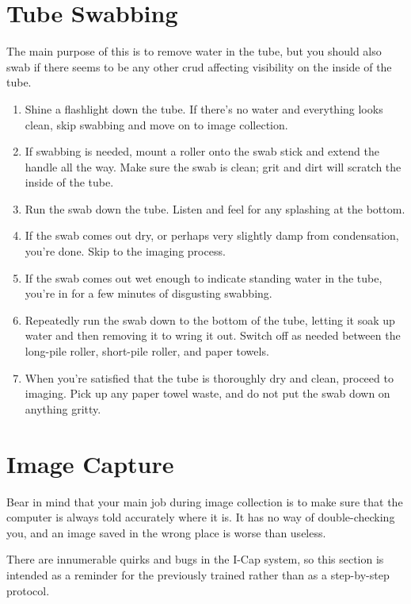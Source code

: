 \documentclass[11pt]{article}
\begin{document}
\section{Tube Swabbing}
	The main purpose of this is to remove water in the tube, but you should also  swab if there seems to be any other crud affecting visibility on the inside of the tube. 
	\begin{enumerate}
		\item{Shine a flashlight down the tube. If there's no water and everything looks clean, skip swabbing and move on to image collection.}
		\item{If swabbing is needed, mount a roller onto the swab stick and extend the handle all the way. Make sure the swab is clean; grit and dirt will scratch the inside of the tube.}
		\item{Run the swab down the tube. Listen and feel for any splashing at the bottom.}
		\item{If the swab comes out dry, or perhaps very slightly damp from condensation, you're done. Skip to the imaging process.}
		\item{If the swab comes out wet enough to indicate standing water in the  tube, you're in for a few minutes of disgusting swabbing.}
		\item{Repeatedly run the swab down to the bottom of the tube, letting it soak up water and then removing it to wring it out. Switch off as needed between the long-pile roller, short-pile roller, and paper towels.}
		\item{When you're satisfied that the tube is thoroughly dry and clean, proceed to imaging. Pick up any paper towel waste, and do not put the swab down on anything gritty.}
\end{enumerate}
	
\section{Image Capture}
	Bear in mind that your main job during image collection is to make sure that the computer is always told accurately where it is. It has no way of double-checking you, and an image saved in the wrong place is worse than useless.
	
	There are innumerable quirks and bugs in the I-Cap system, so this section is intended as a reminder for the previously trained rather than as a step-by-step protocol.
	
\end{document}
